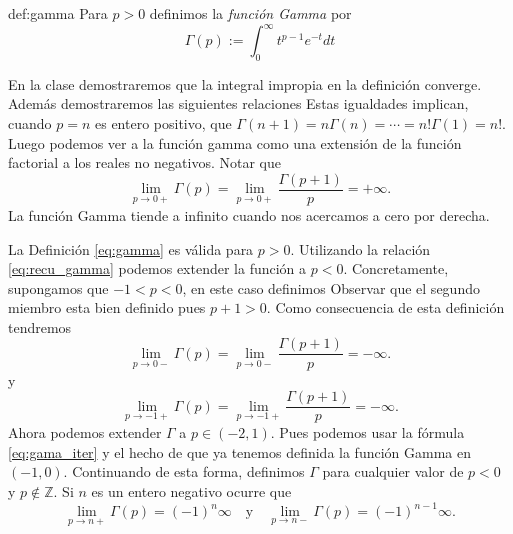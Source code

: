 \begin{definicion}{def:gamma} Para $p>0$ definimos la \emph{función Gamma} por
\begin{equation}\label{eq:gamma}\Gamma(p):=\int_0^{\infty}t^{p-1}e^{-t}dt
\end{equation}
\end{definicion}

En la clase demostraremos que la integral impropia en la definición converge. Además demostraremos las siguientes relaciones
Estas igualdades  implican, cuando $p=n$ es entero positivo, que $\Gamma(n+1)=n\Gamma(n)=\cdots=n!\Gamma(1)=n!$. Luego podemos ver a la función gamma como una extensión de la función factorial a los reales no negativos. Notar que
\[\lim_{p\to 0+}\Gamma(p)=\lim_{p\to 0+}\frac{\Gamma(p+1)}{p}=+\infty.\]
La función Gamma tiende a  infinito cuando nos acercamos a cero por derecha.

La Definición \ref{eq:gamma} es válida para $p>0$. Utilizando la relación \eqref{eq:recu_gamma} podemos extender la función a $p<0$. Concretamente,  supongamos  que $-1<p<0$, en  este caso definimos
Observar que el segundo miembro esta bien definido pues $p+1>0$. Como consecuencia de esta definición tendremos
\[\lim_{p\to 0-}\Gamma(p)=\lim_{p\to 0-}\frac{\Gamma(p+1)}{p}=-\infty.\]
y
\[\lim_{p\to -1+}\Gamma(p)=\lim_{p\to -1+}\frac{\Gamma(p+1)}{p}=-\infty.\]
Ahora podemos extender $\Gamma$ a $p\in (-2,1)$. Pues  podemos usar la fórmula \eqref{eq:gama_iter} y el hecho de que ya tenemos definida la función Gamma en $(-1,0)$. Continuando de esta forma, definimos $\Gamma$ para cualquier valor de $p<0$ y $p\notin \mathbb{Z}$. Si $n$ es un entero negativo ocurre que
\[\lim_{p\to n+}\Gamma(p)=(-1)^n\infty\quad\text{y}\quad \lim_{p\to n-}\Gamma(p)=(-1)^{n-1}\infty.\]




